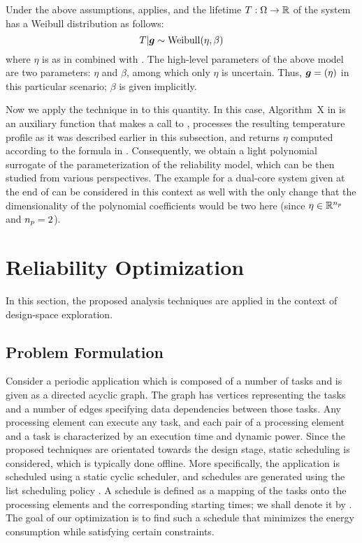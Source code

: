Under the above assumptions,  applies, and the
lifetime $T: \Omega \to \mathbb{R}$ of the system has a Weibull distribution as
follows:
\[
  T | \boldsymbol{g} \sim \mathrm{Weibull}(\eta, \beta)
\]
where $\eta$ is as in  combined with
. The high-level parameters of the above model are
two parameters: $\eta$ and $\beta$, among which only $\eta$ is uncertain.
Thus, $\boldsymbol{g} = (\eta)$ in this particular scenario; $\beta$ is given implicitly.

Now we apply the technique in  to this quantity. In
this case, Algorithm~X in  is an auxiliary function
that makes a call to , processes the resulting
temperature profile as it was described earlier in this subsection, and returns
$\eta$ computed according to the formula in .
Consequently, we obtain a light polynomial surrogate of the parameterization of
the reliability model, which can be then studied from various perspectives. The
example for a dual-core system given at the end of 
can be considered in this context as well with the only change that the
dimensionality of the polynomial coefficients would be two here (since $\eta \in
\mathbb{R}^{n_{p}}$ and ${n_{p}} = 2$).

\section{Reliability Optimization}

In this section, the proposed analysis techniques are applied in the context of
design-space exploration.

\subsection{Problem Formulation}

Consider a periodic application which is composed of a number of tasks and is
given as a directed acyclic graph. The graph has \nt vertices representing the
tasks and a number of edges specifying data dependencies between those tasks.
Any processing element can execute any task, and each pair of a processing
element and a task is characterized by an execution time and dynamic power.
Since the proposed techniques are orientated towards the design stage, static
scheduling is considered, which is typically done offline. More specifically,
the application is scheduled using a static cyclic scheduler, and schedules are
generated using the list scheduling policy \cite{adam1974}. A schedule is
defined as a mapping of the tasks onto the processing elements and the
corresponding starting times; we shall denote it by \schedule. The goal of our
optimization is to find such a schedule \schedule that minimizes the energy
consumption while satisfying certain constraints.

